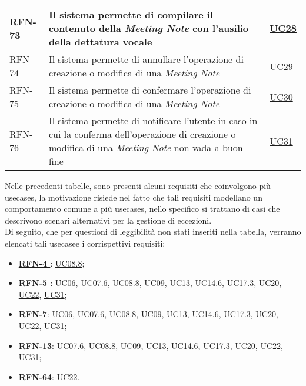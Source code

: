 \begin{table}
\begin{tabularx}{\textwidth}{lXl}
    \hline
    RFN-73 \label{RFN-73} & Il sistema permette di compilare il contenuto della \emph{Meeting Note} con l'ausilio della dettatura vocale & \hyperref[UC28]{UC28} \\
    \hline
    RFN-74 \label{RFN-74} & Il sistema permette di annullare l'operazione di creazione o modifica di una \emph{Meeting Note} & \hyperref[UC29]{UC29} \\
    \hline
    RFN-75 \label{RFN-75} & Il sistema permette di confermare l'operazione di creazione o modifica di una \emph{Meeting Note} & \hyperref[UC30]{UC30} \\
    \hline
    RFN-76 \label{RFN-76} & Il sistema permette di notificare l'utente in caso in cui la conferma dell'operazione di creazione o modifica di una \emph{Meeting Note} non vada a buon fine & \hyperref[UC31]{UC31} \\
    \hline
\end{tabularx}
\end{table}

\clearpage

\noindent Nelle precedenti tabelle, sono presenti alcuni requisiti che coinvolgono più \glspl{usecase}\glsoccur, la motivazione risiede nel fatto che tali requisiti modellano un comportamento comune a più \glspl{usecase}\glsoccur, nello specifico si trattano di casi che descrivono scenari alternativi per la gestione di eccezioni.\\
Di seguito, che per questioni di leggibilità non stati inseriti nella tabella, verranno elencati tali \gls{usecase}\glsoccur e i corrispettivi requisiti:
\begin{itemize}
    \item \textbf{\hyperref[RFN-4]{RFN-4 }}: \hyperref[UC08.8]{UC08.8};
    \item \textbf{\hyperref[RFN-5]{RFN-5 }}: \hyperref[UC06]{UC06}, \hyperref[UC07.6]{UC07.6}, \hyperref[UC08.8]{UC08.8}, \hyperref[UC09]{UC09}, \hyperref[UC13]{UC13}, \hyperref[UC14.6]{UC14.6}, \hyperref[UC17.3]{UC17.3}, \hyperref[UC20]{UC20}, \hyperref[UC22]{UC22}, \hyperref[UC31]{UC31};
    \item \textbf{\hyperref[RFN-7]{RFN-7}}: \hyperref[UC06]{UC06}, \hyperref[UC07.6]{UC07.6}, \hyperref[UC08.8]{UC08.8}, \hyperref[UC09]{UC09}, \hyperref[UC13]{UC13}, \hyperref[UC14.6]{UC14.6}, \hyperref[UC17.3]{UC17.3}, \hyperref[UC20]{UC20}, \hyperref[UC22]{UC22}, \hyperref[UC31]{UC31};
    \item \textbf{\hyperref[RFN-13]{RFN-13}}: \hyperref[UC07.6]{UC07.6}, \hyperref[UC08.8]{UC08.8}, \hyperref[UC09]{UC09}, \hyperref[UC13]{UC13}, \hyperref[UC14.6]{UC14.6}, \hyperref[UC17.3]{UC17.3}, \hyperref[UC20]{UC20}, \hyperref[UC22]{UC22}, \hyperref[UC31]{UC31};
    \item \textbf{\hyperref[RFN-64]{RFN-64}}: \hyperref[UC22]{UC22}.
\end{itemize}

